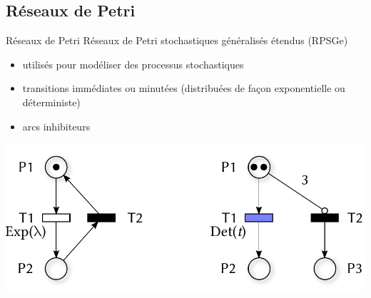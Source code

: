 \documentclass[aspectratio=43]{beamer} %
\begin{document}
\subsection[RPGSe]{Réseaux de Petri}
\begin{frame}{Réseaux de Petri}
  \alert{Réseaux de Petri stochastiques généralisés étendus} (RPSGe)
  \begin{itemize}
    \item utilisés pour modéliser des processus stochastiques
    \item transitions \alert{immédiates} ou \alert{minutées} (distribuées de façon exponentielle ou déterministe)
    \item arcs inhibiteurs
  \end{itemize}

  \vfill\centering
  \includegraphics[height=.4\textheight]{Figs/RPSGe_example.pdf}
\end{frame}
\end{document}
